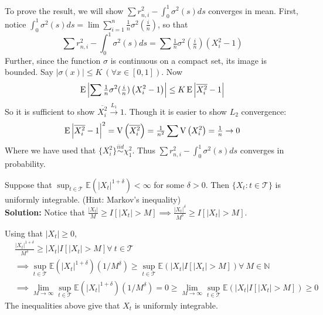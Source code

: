 \documentclass[11pt,letterpaper]{article}                  %
\newcommand{\Var}{\mathrm{V}} %
\begin{document}
\bigskip
\begin{problem} To prove the result, we will show $\sum r^2_{n,i} - \int_0^1 \sigma^2(s)
  ds$ converges in mean.  First, notice
  $\int_0^1 \sigma^2(s) ds = \lim \sum_{i=1}^n \tfrac{1}{n} \sigma^2(
  \tfrac{i}{ n}) $, so that
  \begin{equation*}
 \sum r^2_{n,i} - \int_0^1 \sigma^2(s) ds = \sum
  \tfrac{1}{n}\sigma^2( \tfrac{i}{ n}) \left( X_i^2 - 1 \right)
\end{equation*}
Further, since the function $\sigma$ is continuous on a compact set,
its image is bounded. Say $|\sigma(x)| \le K \ \left(\forall x \in
  [0,1]\right)$. Now
\begin{equation*}
  \operatorname{E} \left|  \sum
  \tfrac{1}{n}\sigma^2( \tfrac{i}{ n}) \left( X_i^2 - 1 \right)\right|
\le K \operatorname{E} \left| \overline{X^2_i} - 1 \right|
\end{equation*}
So it is sufficient to show $\overline{X^2_i} \xrightarrow{L_1}
1$. Though it is easier to show $L_2$ convergence:
\begin{equation*}
  \E \left| \overline{X^2_i} - 1 \right|^2 = \Var \left(\overline{X_i^2}\right) =
  \tfrac{1}{n^2} \sum \Var \left(X_i^2\right) = \tfrac{1}{n}
  \rightarrow 0
\end{equation*}
Where we have used that $\{X_i^2\} \overset{iid}{\sim} \chi^2_1$. Thus $\sum r^2_{n,i} - \int_0^1 \sigma^2(s)
  ds$ converges in probability.

\end{problem}

\bigskip
\begin{problem}
Suppose that $\sup_{t \in \mathcal{T}} \mathbb{E}(|X_t|^{1+\delta}) < \infty$ for some $\delta >0$. Then $\{X_t : t \in \mathcal{T}\}$ is uniformly integrable. (Hint: Markov's inequality) \\

\textbf{Solution:} Notice that $\frac{|X_t|}{M} \geq I[|X_t|>M] \implies \frac{|X_t|^{\delta}}{M^{\delta}} \geq I[|X_t|>M]$. 

Using that $|X_t|\geq 0$,
\begin{align*}
&\frac{|X_t|^{1+\delta}}{M^{\delta}}\geq |X_t| I[|X_t|>M] \forall \ t \in \mathcal{T}\\
&\implies \sup_{t \in \mathcal{T}} \mathbb{E}(|X_t|^{1+\delta}) (1/M^{\delta}) \geq \sup_{t \in \mathcal{T}} \mathbb{E}(|X_t|I[|X_t|>M]) \forall \ M \in \mathbb{N} \\
&\implies \lim_{M \to \infty} \sup_{t \in \mathcal{T}} \mathbb{E}(|X_t|^{1+\delta}) (1/M^{\delta}) = 0 \geq \lim_{M \to \infty} \sup_{t \in \mathcal{T}} \mathbb{E}(|X_t|I[|X_t|>M]) \geq 0
\end{align*}
The inequalities above give that $X_t$ is uniformly integrable.
\end{problem}
\end{document}
